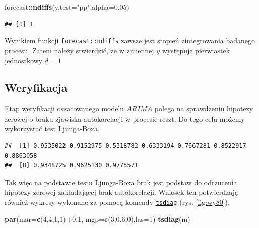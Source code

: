 \documentclass[polish,]{book}
\newenvironment{Shaded}{\begin{snugshade}}{\end{snugshade}}
\newcommand{\ControlFlowTok}[1]{\textcolor[rgb]{0.13,0.29,0.53}{\textbf{#1}}}
\newcommand{\DataTypeTok}[1]{\textcolor[rgb]{0.13,0.29,0.53}{#1}}
\newcommand{\DecValTok}[1]{\textcolor[rgb]{0.00,0.00,0.81}{#1}}
\newcommand{\FloatTok}[1]{\textcolor[rgb]{0.00,0.00,0.81}{#1}}
\newcommand{\KeywordTok}[1]{\textcolor[rgb]{0.13,0.29,0.53}{\textbf{#1}}}
\newcommand{\NormalTok}[1]{#1}
\newcommand{\OperatorTok}[1]{\textcolor[rgb]{0.81,0.36,0.00}{\textbf{#1}}}
\newcommand{\StringTok}[1]{\textcolor[rgb]{0.31,0.60,0.02}{#1}}
\begin{document}
\begin{Shaded}
\begin{Highlighting}[]
\NormalTok{forecast}\OperatorTok{::}\KeywordTok{ndiffs}\NormalTok{(y,}\DataTypeTok{test=}\StringTok{"pp"}\NormalTok{,}\DataTypeTok{alpha=}\FloatTok{0.05}\NormalTok{)}
\end{Highlighting}
\end{Shaded}

\begin{verbatim}
## [1] 1
\end{verbatim}

Wynikiem funkcji \href{https://rdrr.io/cran/forecast/man/ndiffs.html}{\texttt{forecast::ndiffs}} zawsze jest stopień zintegrowania badanego
procesu. Zatem należy stwierdzić, że w zmiennej \(y\) występuje pierwiastek jednostkowy \(d = 1\).

\hypertarget{part_732}{%
\subsection{Weryfikacja}\label{part_732}}

Etap weryfikacji oszacowanego modelu \(ARIMA\) polega na sprawdzeniu hipotezy zerowej o braku zjawiska autokorelacji w procesie reszt. Do tego celu możemy wykorzystać test Ljunga-Boxa.

\begin{Shaded}
\end{Shaded}

\begin{verbatim}
##  [1] 0.9535022 0.9152975 0.5318782 0.6333194 0.7667281 0.8522917 0.8863058
##  [8] 0.9348725 0.9625130 0.9775571
\end{verbatim}

Tak więc na podstawie testu Ljunga-Boxa brak jest podstaw do odrzucenia hipotezy
zerowej zakładającej brak autokorelacji. Wniosek ten potwierdzają również wykresy
wykonane za pomocą komendy \href{https://rdrr.io/r/stats/tsdiag.html}{\texttt{tsdiag}} (rys. \ref{fig:wy80}).

\begin{Shaded}
\begin{Highlighting}[]
\KeywordTok{par}\NormalTok{(}\DataTypeTok{mar=}\KeywordTok{c}\NormalTok{(}\DecValTok{4}\NormalTok{,}\DecValTok{4}\NormalTok{,}\DecValTok{1}\NormalTok{,}\DecValTok{1}\NormalTok{)}\OperatorTok{+}\FloatTok{0.1}\NormalTok{, }\DataTypeTok{mgp=}\KeywordTok{c}\NormalTok{(}\DecValTok{3}\NormalTok{,}\FloatTok{0.6}\NormalTok{,}\DecValTok{0}\NormalTok{),}\DataTypeTok{las=}\DecValTok{1}\NormalTok{)}
\KeywordTok{tsdiag}\NormalTok{(m)}
\end{Highlighting}
\end{Shaded}
\end{document}
